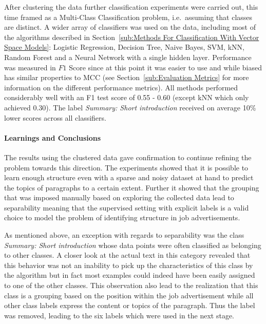 After clustering the data further classification experiments were carried out, this time framed as a \gls{Multi-Class Classification} problem, i.e.\ assuming that classes are distinct. A wider array of classifiers was used on the data, including most of the algorithms described in Section~\ref{sub:Methods For Classification With Vector Space Models}: Logistic Regression, Decision Tree, Naive Bayes, SVM, kNN, Random Forest and a Neural Network with a single hidden layer. Performance was measured in $F1$ Score since at this point it was easier to use and while biased has similar properties to \gls{MCC} (see Section~\ref{sub:Evaluation Metrics} for more information on the different performance metrics). All methods performed considerably well with an F1 test score of 0.55 - 0.60 (except \gls{kNN} which only achieved 0.30). The label \emph{Summary: Short introduction} received on average 10\% lower scores across all classifiers.

\paragraph{Learnings and Conclusions}
\label{par:Learnings and Conclusions (Multi-label Paragraph Classification)}

The results using the clustered data gave confirmation to continue refining the problem towards this direction. The experiments showed that it is possible to learn enough structure even with a sparse and noisy dataset at hand to predict the topics of paragraphs to a certain extent. Further it showed that the grouping that was imposed manually based on exploring the collected data lead to separability meaning that the supervised setting with explicit labels is a valid choice to model the problem of identifying structure in job advertisements.

As mentioned above, an exception with regards to separability was the class \emph{Summary: Short introduction} whose data points were often classified as belonging to other classes. A closer look at the actual text in this category revealed that this behavior was not an inability to pick up the characteristics of this class by the algorithm but in fact most examples could indeed have been easily assigned to one of the other classes. This observation also lead to the realization that this class is a grouping based on the position within the job advertisement while all other class labels express the content or topics of the paragraph. Thus the label was removed, leading to the six labels which were used in the next stage.

